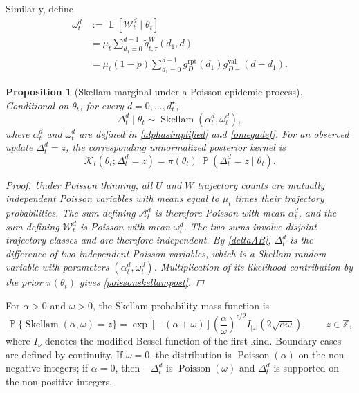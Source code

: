 \documentclass{article}
\newtheorem{proposition}{Proposition}
\theoremstyle{definition}
\theoremstyle{remark}
\newcommand{\Pois}{\operatorname{Poisson}}
\newcommand{\Sk}{\operatorname{Skellam}}
\newcommand{\E}{\operatorname{\mathbb{E}}}
\newcommand{\Prb}{\operatorname{\mathbb{P}}}
\begin{document}
Similarly, define
\begin{equation}\label{omegadef}
\begin{split}
    \omega_t^d
    &:={}
    \E[\mathcal W_t^d\mid\theta_t]\\
    &=
    \mu_t
    \sum_{d_1=0}^{d-1}
    \tilde q_{t,\tau}^{W}(d_1,d)\\
    &=
    \mu_t(1-p)
    \sum_{d_1=0}^{d-1}
    g_D^{\mathrm{rpt}}(d_1)
    g_{D-}^{\mathrm{val}}(d-d_1).
\end{split}
\end{equation}

\begin{proposition}[Skellam marginal under a Poisson epidemic process]\label{prop:poissonskellam}
Conditional on $\theta_t$, for every $d=0,\dots,d_t^{\star}$,
\begin{equation}\label{poissonskellam}
    \Delta_t^d\mid\theta_t
    \sim
    \Sk(\alpha_t^d,\omega_t^d),
\end{equation}
where $\alpha_t^d$ and $\omega_t^d$ are defined in \eqref{alphasimplified} and \eqref{omegadef}. For an observed update $\Delta_t^d=z$, the corresponding unnormalized posterior kernel is
\begin{equation}\label{poissonskellampost}
    \mathcal K_t(\theta_t;\Delta_t^d=z)
    =
    \pi(\theta_t)\,
    \Prb(\Delta_t^d=z\mid\theta_t).
\end{equation}
\begin{proof}
Under Poisson thinning, all $U$ and $W$ trajectory counts are mutually independent Poisson variables with means equal to $\mu_t$ times their trajectory probabilities. The sum defining $\mathcal A_t^d$ is therefore Poisson with mean $\alpha_t^d$, and the sum defining $\mathcal W_t^d$ is Poisson with mean $\omega_t^d$. The two sums involve disjoint trajectory classes and are therefore independent. By \eqref{deltaAB}, $\Delta_t^d$ is the difference of two independent Poisson variables, which is a Skellam random variable with parameters $(\alpha_t^d,\omega_t^d)$. Multiplication of its likelihood contribution by the prior $\pi(\theta_t)$ gives \eqref{poissonskellampost}.
\end{proof}
\end{proposition}

For $\alpha>0$ and $\omega>0$, the Skellam probability mass function is
\begin{equation}\label{skellampmf}
    \Prb\{\Sk(\alpha,\omega)=z\}
    =
    \exp[-(\alpha+\omega)]
    \left(\frac{\alpha}{\omega}\right)^{z/2}
    I_{|z|}\left(2\sqrt{\alpha\omega}\right),
    \qquad z\in\mathbb Z,
\end{equation}
where $I_\nu$ denotes the modified Bessel function of the first kind. Boundary cases are defined by continuity. If $\omega=0$, the distribution is $\Pois(\alpha)$ on the non-negative integers; if $\alpha=0$, then $-\Delta_t^d$ is $\Pois(\omega)$ and $\Delta_t^d$ is supported on the non-positive integers.
\end{document}

